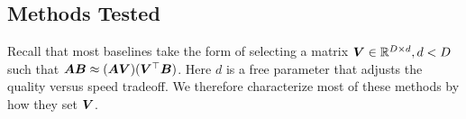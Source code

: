 \subsection{Methods Tested}
\vspace{-.5mm}
Recall that most baselines take the form of selecting a matrix $\bm{V} \in \mathbb{R}^{D \times d}, d < D$ such that $\bm{A} \bm{B} \approx (\bm{A} \bm{V}) (\bm{V}^\top \bm{B})$. Here $d$ is a free parameter that adjusts the quality versus speed tradeoff. We therefore characterize most of these methods by how they set $\bm{V}$.
\vspace{-2.5mm}
